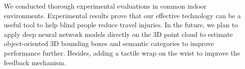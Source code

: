 \documentclass{ieeeaccess}
\begin{document}
 
We conducted thorough experimental evaluations in common indoor environments. Experimental results prove that our effective technology can be a useful tool to help blind people reduce travel injuries. In the future, we plan to apply deep neural network models directly on the 3D point cloud to estimate object-oriented 3D bounding boxes and semantic categories to improve performance further. Besides, adding a tactile wrap on the wrist to improve the feedback mechanism. 





%
%
%
%  
%  
%  
%
\end{document}
